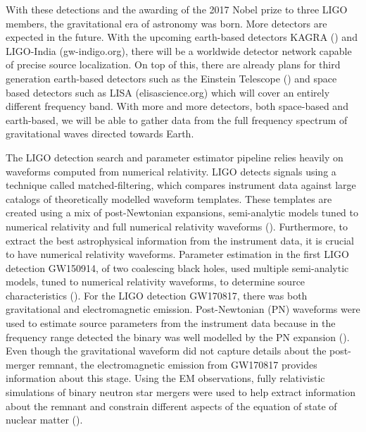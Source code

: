 With these detections and the awarding of the 2017 Nobel prize to three LIGO members, the gravitational era of astronomy was born. More detectors are expected in the future. With the upcoming earth-based detectors KAGRA (\cite{somiya2012detector}) and LIGO-India (gw-indigo.org), there will be a worldwide detector network capable of precise source localization. On top of this, there are already plans for third generation earth-based detectors such as the Einstein Telescope (\cite{einsteintelescope}) and space based detectors such as LISA (elisascience.org) which will cover an entirely different frequency band. With more and more detectors, both space-based and earth-based, we will be able to gather data from the full frequency spectrum of gravitational waves directed towards Earth.

The LIGO detection search and parameter estimator pipeline relies heavily on waveforms computed from numerical relativity. LIGO detects signals using a technique called matched-filtering, which compares instrument data against large catalogs of theoretically modelled waveform templates. These templates are created using a mix of post-Newtonian expansions, semi-analytic models tuned to numerical relativity and full numerical relativity waveforms (\cite{sachdev2019gstlal}). Furthermore, to extract the best astrophysical information from the instrument data, it is crucial to have numerical relativity waveforms. Parameter estimation in the first LIGO detection GW150914, of two coalescing black holes, used multiple semi-analytic models, tuned to numerical relativity waveforms, to determine source characteristics (\cite{abbott2016improved}). For the LIGO detection GW170817, there was both gravitational and electromagnetic emission. Post-Newtonian (PN) waveforms were used to estimate source parameters from the instrument data because in the frequency range detected the binary was well modelled by the PN expansion (\cite{abbott2017gw170817}). Even though the gravitational waveform did not capture details about the post-merger remnant, the electromagnetic emission from GW170817 provides information about this stage. Using the EM observations, fully relativistic simulations of binary neutron star mergers were used to help extract information about the remnant and constrain different aspects of the equation of state of nuclear matter (\cite{radice2017gw170817,shibata2017gw170817}). 


